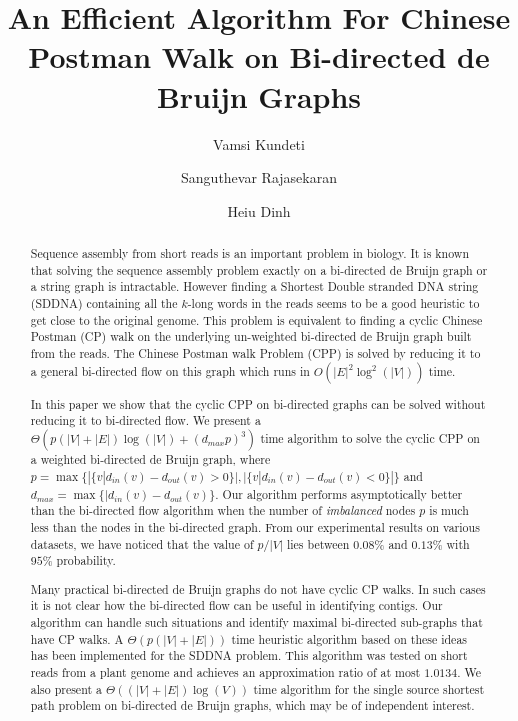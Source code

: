 \documentclass[runningheads]{llncs}
\begin{document}
\title{An Efficient Algorithm For Chinese Postman Walk on Bi-directed de Bruijn Graphs} 


\author{Vamsi Kundeti \and Sanguthevar Rajasekaran \and Heiu Dinh}
 \maketitle

\begin{abstract}
Sequence assembly from short reads is an important problem in biology. It is known that solving the sequence assembly problem exactly on a bi-directed de Bruijn
graph or a string graph is intractable. 
However finding a Shortest Double stranded DNA string (SDDNA) containing all the $k$-long 
words in the reads seems to be a good heuristic to get close to the original genome. This problem is equivalent to finding a cyclic Chinese Postman (CP) walk on the underlying un-weighted 
bi-directed de Bruijn graph built from the reads. The Chinese Postman walk Problem (CPP) is solved by reducing it to a general bi-directed flow on this graph which runs in $O(|E|^2\log^2(|V|))$ time.  

\vspace{0.1in}

In this paper we show that the cyclic CPP on bi-directed graphs can be solved without reducing
it to bi-directed flow. We present a $\Theta(p(|V|+|E|)\log(|V|) + (d_{max}p)^3 )$ time
algorithm to solve the cyclic CPP on a weighted bi-directed de Bruijn graph, where 
$p = \max\{|\{v | d_{in}(v)-d_{out}(v) > 0\}|, |\{ v | d_{in}(v) - d_{out}(v) < 0\}|\}$
and $d_{max} = \max\{ |d_{in}(v)-d_{out}(v)\}$. Our algorithm performs asymptotically
better than the bi-directed flow algorithm when the number of {\em imbalanced} nodes 
$p$ is much less than the nodes in the bi-directed graph. From our experimental
results on various datasets, we have noticed that the value of $p/|V|$ lies between $0.08\%$ and $0.13\%$ with $95\%$ probability.

\vspace{0.1in}

Many practical bi-directed de Bruijn graphs do not have cyclic CP walks. In such cases
it is not clear how the bi-directed flow can be useful in identifying contigs. Our
algorithm can handle such situations and identify maximal bi-directed sub-graphs
that have CP walks. A $\Theta(p(|V|+|E|))$ time heuristic algorithm based on these ideas
has been implemented for the SDDNA problem. This algorithm was tested on short reads
from a plant genome and achieves an approximation ratio of at most $1.0134$. We also present a $\Theta((|V|+|E|)\log(V))$ time algorithm for the single 
source shortest path problem on bi-directed de Bruijn graphs, which may be of 
independent interest. 
\end{abstract}
\end{document}
